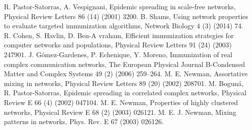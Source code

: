 \documentclass[UTF8]{ctexart}
\begin{document}
\begin{thebibliography}{99}
	 R. Pastor-Satorras, A. Vespignani, Epidemic spreading in scale-free networks, Physical Review Letters 86 (14) (2001)
	3200.
	B. Shams, Using network properties to evaluate targeted immunization algorithms, Network Biology 4 (3) (2014) 74.
	R. Cohen, S. Havlin, D. Ben-A vraham, Efficient immunization strategies for computer networks and populations, Physical
	Review Letters 91 (24) (2003) 247901.
	J. Gómez-Gardenes, P. Echenique, Y. Moreno, Immunization of real complex communication networks, The European
	Physical Journal B-Condensed Matter and Complex Systems 49 (2) (2006) 259–264.
	M. E. Newman, Assortative mixing in networks, Physical Review Letters 89 (20) (2002) 208701.
	M. Boguná, R. Pastor-Satorras, Epidemic spreading in correlated complex networks, Physical Review E 66 (4) (2002)
	047104.
	M. E. Newman, Properties of highly clustered networks, Physical Review E 68 (2) (2003) 026121.
	M. E. J. Newman, Mixing patterns in networks, Phys. Rev. E 67 (2003) 026126.
\end{thebibliography}
\end{document}
